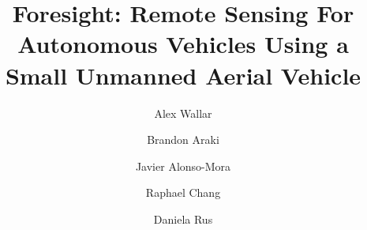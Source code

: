 \documentclass[graybox]{svmult}
\begin{document}
\title*{Foresight: Remote Sensing For Autonomous Vehicles Using a Small
Unmanned Aerial Vehicle}


\author{Alex Wallar \and Brandon Araki \and Javier Alonso-Mora \and Raphael Chang
\and Daniela Rus}


\maketitle


















\end{document}
